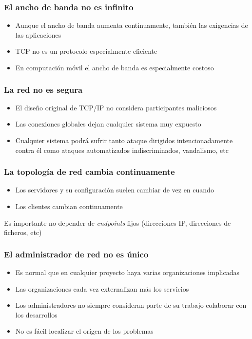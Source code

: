 \documentclass[ucs]{beamer}
\begin{document}
\begin{frame}[fragile]
\frametitle{El ancho de banda no es infinito}
\begin{itemize}
\item
Aunque el ancho de banda aumenta continuamente, también las exigencias de las aplicaciones
\item
TCP no es un protocolo especialmente eficiente
\item
En computación móvil el ancho de banda es especialmente costoso
\end{itemize}

\end{frame}


\begin{frame}[fragile]
\frametitle{La red no es segura}
\begin{itemize}
\item
El diseño original de TCP/IP no considera participantes maliciosos
\item
Las conexiones globales dejan cualquier sistema muy expuesto
\item
Cualquier sistema podrá sufrir tanto ataque dirigidos intencionadamente contra él
como ataques automatizados indiscriminados, vandalismo, etc
\end{itemize}

\end{frame}


\begin{frame}[fragile]
\frametitle{La topología de red cambia continuamente}
\begin{itemize}
\item
Los servidores y su configuración suelen cambiar de vez en cuando
\item
Los clientes cambian continuamente
\end{itemize}

Es importante no depender de \emph{endpoints} fijos (direcciones IP, direcciones de ficheros, etc)
\end{frame}

\begin{frame}[fragile]
\frametitle{El administrador de red no es único}
\begin{itemize}
\item
Es normal que en cualquier proyecto haya varias organizaciones implicadas
\item
Las organizaciones cada vez externalizan más los servicios
\item
Los administradores no siempre consideran parte de su trabajo colaborar
con los desarrollos
\item
No es fácil localizar el origen de los problemas
\end{itemize}
\end{frame}
\end{document}
